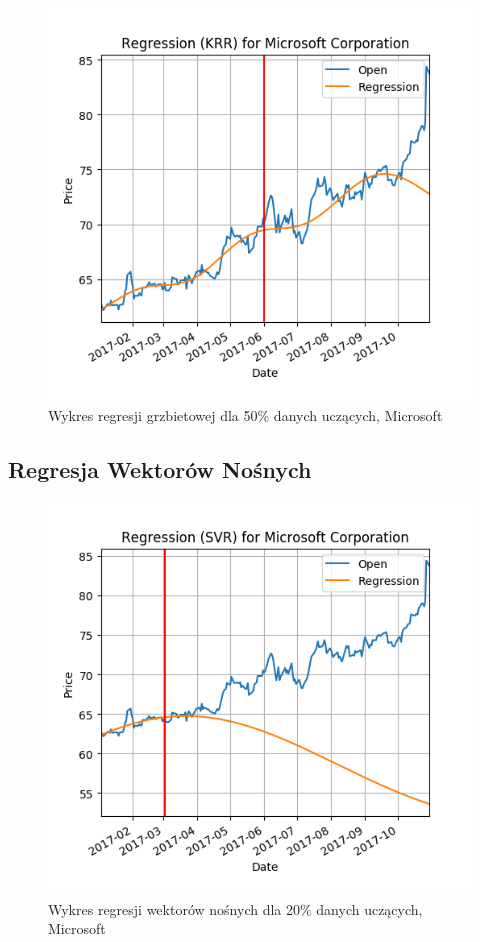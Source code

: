 \begin{figure}[h!]
\centering
\includegraphics[width=150mm]{pictures/plots/microsoft_krr_50.png}
\caption{Wykres regresji grzbietowej dla 50\% danych uczących, Microsoft}
\label{fig:Wykres regresji grzbietowej dla 50\% danych uczących, Microsoft}
\end{figure}


\subsection{Regresja Wektorów Nośnych}

\begin{figure}[h!]
\centering
\includegraphics[width=150mm]{pictures/plots/microsoft_svr_20.png}
\caption{Wykres regresji wektorów nośnych dla 20\% danych uczących, Microsoft}
\label{fig:Wykres regresji wektorów nośnych dla 20\% danych uczących, Microsoft}
\end{figure}

